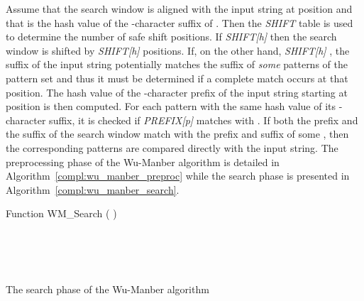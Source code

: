 \documentclass{ws-ijait}
\begin{document}
Assume that the search window is aligned with the input string at position  and that  is the hash value of the -character suffix of . Then the \textit{SHIFT} table is used to determine the number of safe shift positions. If \textit{SHIFT[h]}  then the search window is shifted by \textit{SHIFT[h]} positions. If, on the other hand, \textit{SHIFT[h]} , the suffix of the input string potentially matches the suffix of \textit{some} patterns of the pattern set and thus it must be determined if a complete match occurs at that position. The hash value  of the -character prefix of the input string starting at position  is then computed. For each pattern  with the same hash value  of its -character suffix, it is checked if \textit{PREFIX[p]} matches with . If both the prefix and the suffix of the search window match with the prefix and suffix of some , then the corresponding patterns are compared directly with the input string. The preprocessing phase of the Wu-Manber algorithm is detailed in Algorithm~\ref{compl:wu_manber_preproc} while the search phase is presented in Algorithm~\ref{compl:wu_manber_search}.

\begin{algorithm}[h]

Function WM\_Search (  )\\

\\

\While {  } {

	\\

	
	\uIf {  } {
		\\
	}
}

\caption{The search phase of the Wu-Manber algorithm}
\label{compl:wu_manber_search}
\end{algorithm}
\end{document}
